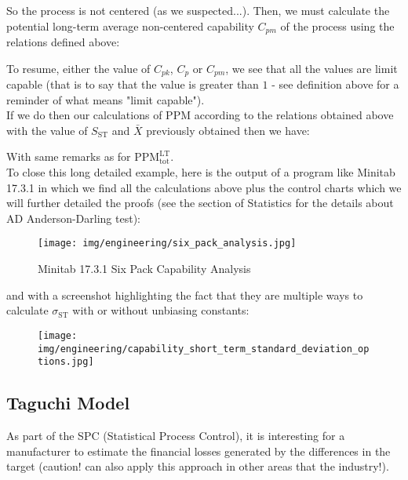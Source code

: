 	\pagebreak
	\begin{tcolorbox}[colframe=black,colback=white,sharp corners]
	
	So the process is not centered (as we suspected...). Then, we must calculate the potential long-term average non-centered capability $C_{pm}$ of the process using the relations defined above:
	
	To resume, either the value of $C_{pk}$, $C_p$ or $C_{pm}$, we see that all the values are limit capable (that is to say that the value is greater than $1$ - see definition above for a reminder of what means "limit capable").\\
	
	If we do then our calculations of PPM according to the relations obtained above with the value of $S_{\text{ST}}$ and $\bar{X}$ previously obtained then we have:
	
	With same remarks as for $\text{PPM}_{\text{tot}}^{\text{LT}}$.\\
	
	To close this long detailed example, here is the output of a program like Minitab 17.3.1 in which we find all the calculations above plus the control charts which we will further detailed the proofs (see the section of Statistics for the details about AD Anderson-Darling test):
	\begin{figure}[H]
		\centering
		\texttt{[image: img/engineering/six\_pack\_analysis.jpg]}
		\caption[]{Minitab 17.3.1 Six Pack Capability Analysis}
	\end{figure}
	\end{tcolorbox}
	
	\pagebreak
	\begin{tcolorbox}[colframe=black,colback=white,sharp corners]
	and with a screenshot highlighting the fact that they are multiple ways to calculate $\sigma_{\text{ST}}$ with or without unbiasing constants:
	\begin{figure}[H]
		\centering
		\texttt{[image: img/engineering/capability\_short\_term\_standard\_deviation\_options.jpg]}
	\end{figure}
	\end{tcolorbox}
	
	\pagebreak
	\subsection{Taguchi Model}
	As part of the SPC (Statistical Process Control), it is interesting for a manufacturer to estimate the financial losses generated by the differences in the target (caution! can also apply this approach in other areas that the industry!).
	

